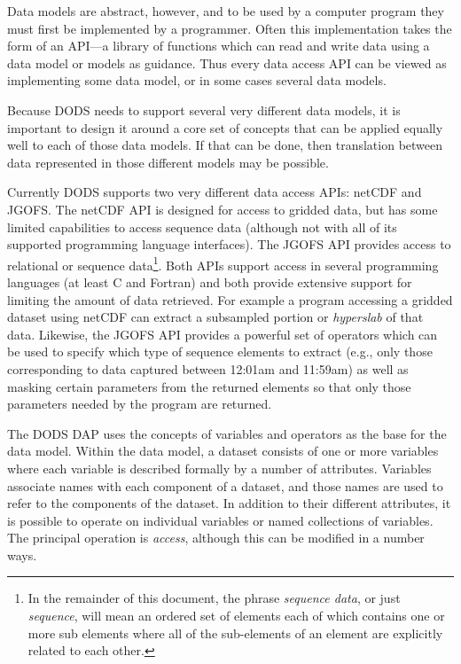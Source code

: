 Data models are abstract, however, and to be used by a computer program they
must first be implemented by a programmer. Often this implementation takes
the form of an API---a library of functions which can read and write data
using a data model or models as guidance. Thus every data access API can be
viewed as implementing some data model, or in some cases several data models.

Because DODS needs to support several very different data models, it is
important to design it around a core set of concepts that can be applied
equally well to each of those data models. If that can be done, then
translation between data represented in those different models may be
possible.

Currently DODS supports two very different data access APIs: netCDF
and JGOFS\@. The netCDF API is designed for access to gridded data,
but has some limited capabilities to access sequence data (although
not with all of its supported programming language interfaces). The
JGOFS API provides access to relational or sequence data\footnote{In
  the remainder of this document, the phrase {\em sequence data}, or
  just {\em sequence}, will mean an ordered set of elements each of
  which contains one or more sub elements where all of the sub-elements
  of an element are explicitly related to each other.}.  Both APIs
support access in several programming languages (at least C and
Fortran) and both provide extensive support for limiting the amount of
data retrieved.  For example a program accessing a gridded dataset
using netCDF can extract a subsampled portion or {\em hyperslab\/} of
that data.  Likewise, the JGOFS API provides a powerful set of
operators which can be used to specify which type of sequence elements
to extract (e.g., only those corresponding to data captured between
12:01am and 11:59am) as well as masking certain parameters from the
returned elements so that only those parameters needed by the program
are returned.

The DODS DAP uses the concepts of variables and operators as the base for the
data model. Within the data model, a dataset consists of one or more
variables where each variable is described formally by a number of
attributes.  Variables associate names with each component of a dataset, and
those names are used to refer to the components of the dataset. In addition
to their different attributes, it is possible to operate on individual
variables or named collections of variables. The principal operation is {\em
  access}, although this can be modified in a number ways.

